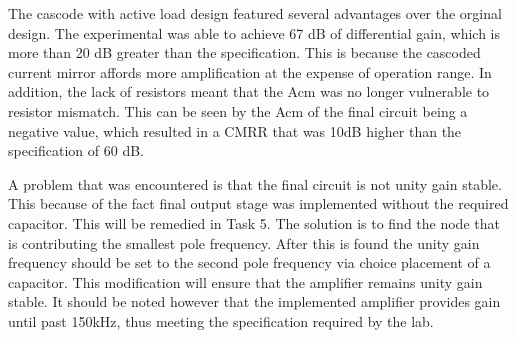 The cascode with active load design featured several advantages over the orginal design. The experimental was able to achieve 67 dB of differential gain, which is more than 20 dB greater than the specification. This is because the cascoded current mirror affords more amplification at the expense of operation range. In addition, the lack of resistors meant that the Acm was no longer vulnerable to resistor mismatch. This can be seen by the Acm of the final circuit being a negative value, which resulted in a CMRR that was 10dB higher than the specification of 60 dB.

A problem that was encountered is that the final circuit is not unity gain stable. This because of the fact final output stage was implemented without the required capacitor. This will be remedied in Task 5. The solution is to find the node that is contributing the smallest pole frequency. After this is found the unity gain frequency should be set to the second pole frequency via choice placement of a capacitor. This modification will ensure that the amplifier remains unity gain stable. It should be noted however that the implemented amplifier provides gain until past 150kHz, thus meeting the specification required by the lab.
